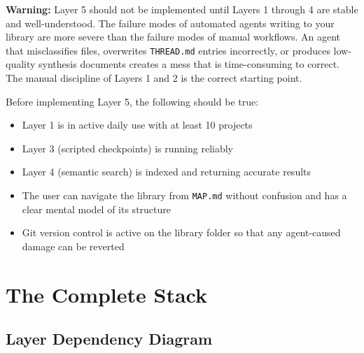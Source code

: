\documentclass[12pt,letterpaper]{article}
\begin{document}
\begin{mdframed}[style=warnbox]
\textbf{Warning:} Layer 5 should not be implemented until Layers 1 through 4
are stable and well-understood. The failure modes of automated agents
writing to your library are more severe than the failure modes of manual
workflows. An agent that misclassifies files, overwrites \texttt{THREAD.md}
entries incorrectly, or produces low-quality synthesis documents creates
a mess that is time-consuming to correct. The manual discipline of
Layers 1 and 2 is the correct starting point.
\end{mdframed}

Before implementing Layer 5, the following should be true:

\begin{itemize}
  \item Layer 1 is in active daily use with at least 10 projects
  \item Layer 3 (scripted checkpoints) is running reliably
  \item Layer 4 (semantic search) is indexed and returning accurate results
  \item The user can navigate the library from \texttt{MAP.md} without
        confusion and has a clear mental model of its structure
  \item Git version control is active on the library folder so that
        any agent-caused damage can be reverted
\end{itemize}

\section{The Complete Stack}

\subsection{Layer Dependency Diagram}
\end{document}
